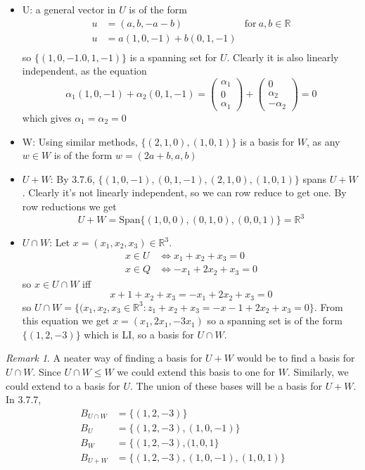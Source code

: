 \documentclass{report}
\theoremstyle{remark}
\newtheorem{remark}[theorem]{Remark}
\theoremstyle{definition}
\theoremstyle{definition}
\theoremstyle{theorem}
\begin{document}
\begin{itemize}
    \item U: a general vector in $U$ is of the form
    \begin{align*}
        u &= (a,b,-a-b) & \text{for} \> a,b \in \mathbb{R}\\
        u &= a(1,0,-1) + b(0,1,-1)\\
    \end{align*}
    so $\{(1,0,-1. 0,1,-1)\}$ is a spanning set for $U$. Clearly it is also linearly independent, as the equation
    \[\alpha_1(1,0,-1) + \alpha_2(0,1,-1) = \begin{pmatrix}\alpha_1\\0\\\alpha_1\end{pmatrix} + \begin{pmatrix}0\\\alpha_2\\-\alpha_2\end{pmatrix} = 0\]
    which gives $\alpha_1 = \alpha_2=0$
    \item W: Using similar methods, $\{(2,1,0), (1,0,1)\}$ is a basis for $W$, as any $w \in W$ is of the form $w = (2a+b, a, b)$
    \item $U+W$: By 3.7.6, $\{(1,0,-1), (0,1,-1), (2,1,0), (1,0,1)\}$ spans $U+W$. Clearly it's not linearly independent, so we can row reduce to get one. By row reductions we get 
    \[U+W = \text{Span}\{(1,0,0),(0,1,0),(0,0,1)\} = \mathbb{R}^3\]
    \item $U \cap W$: Let $x = (x_1, x_2, x_3) \in \mathbb{R}^3$. 
    \begin{align*}
        x \in U &\iff x_1 + x_2 + x_3 =0\\
        x \in Q &\iff -x_1 + 2x_2 + x_3 = 0
    \end{align*}
    so $x \in U\cap W$ iff
    \[x+1 + x_2 + x_3 = -x_1 + 2x_2 + x_3 = 0\]
    so $U \cap W = \{(x_1, x_2, x_3 \in \mathbb{R}^3: z_1 + x_2 + x_3 = -x-1 + 2x_2 + x_3 =0\}$. From this equation we get $x = (x_1, 2x_1, -3x_1)$ so a spanning set is of the form $\{(1,2,-3)\}$ which is LI, so a basis for $U\cap W$.
\end{itemize}
\begin{remark}
A neater way of finding a basis for $U+W$ would be to find a basis for $U \cap W$. Since $U \cap W \leq W$ we could extend this basis to one for $W$. Similarly, we could extend to a basis for $U$. The union of these bases will be a basis for $U + W$. In 3.7.7,
\begin{align*}
    B_{U \cap W} &= \{(1,2,-3)\}\\
    B_U &= \{(1,2,-3), (1,0,-1)\}\\
    B_W &= \{(1,2,-3), (1,0,1\}\\
    B_{U + W} &= \{(1,2,-3), (1,0,-1), (1,0,1)\}
\end{align*}
\end{remark}
\end{document}
